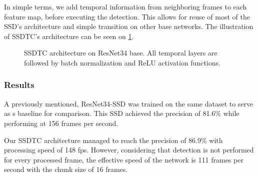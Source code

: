 In simple terms, we add temporal information from neighboring frames to each feature map, before executing the detection. This allows for reuse of most of the SSD's architecture and simple transition on other base networks. The illustration of SSDTC's architecture can be seen on \cref{fig:ssdtc}.

\begin{figure}
    \centering
    \ssdtc
    \caption[Single Shot Detector with Temporal Convolution]{SSDTC architecture on ResNet34 base. All temporal layers are followed by batch normalization and ReLU activation functions.}
    \label{fig:ssdtc}
\end{figure}


\subsubsection{Results}
A previously mentioned, ResNet34-SSD was trained on the same dataset to serve as s baseline for comparison. This SSD achieved the precision of 81.6\% while performing at 156 frames per second. 

Our SSDTC architecture managed to reach the precision of 86.9\% with processing speed of 148 fps. However, considering that detection is not performed for every processed frame, the effective speed of the network is 111 frames per second with the chunk size of 16 frames. 
